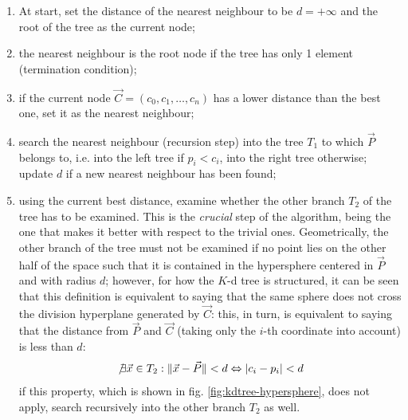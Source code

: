 \begin{enumerate}
  \item{At start, set the distance of the nearest neighbour to be $d=+\infty$
    and the root of the tree as the current node;}
  \item{the nearest neighbour is the root node if the tree has only 1 element
    (termination condition);}
  \item{if the current node $\vec{C}=\left(c_0,c_1,\dots,c_n\right)$ has a lower distance than the best one, set it as
    the nearest neighbour;}
  \item{search the nearest neighbour (recursion step) into the tree $T_1$ to which $\vec{P}$
      belongs to, i.e. into the left tree if $p_i < c_i$, into the right tree
    otherwise; update $d$ if a new nearest neighbour has been found;}
  \item{using the current best distance, examine whether the other branch $T_2$ of
      the tree has to be examined. This is the \emph{crucial} step of the
      algorithm, being the one that makes it better with respect to the trivial
    ones. Geometrically, the other branch of the tree must not be examined if no
    point lies on the other half of the space such that it is contained in the
    hypersphere centered in $\vec{P}$ and with radius $d$; however, for how the $K$-d
    tree is structured, it can be seen that this definition is equivalent to
    saying that the same sphere does not cross the division hyperplane generated
    by $\vec{C}$: this, in turn, is equivalent to saying that the distance from $\vec{P}$
    and $\vec{C}$ (taking only the $i$-th coordinate into account) is less than $d$:
    \begin{equation}
      \not \exists \vec{x} \in T_2 : \lVert \vec{x}-\vec{P} \rVert < d
      \Leftrightarrow \lvert c_i-p_i \rvert < d
    \end{equation}
    if this property, which is shown in fig. \ref{fig:kdtree-hypersphere}, does not apply, search recursively into the other branch
  $T_2$ as well.}
\end{enumerate}


